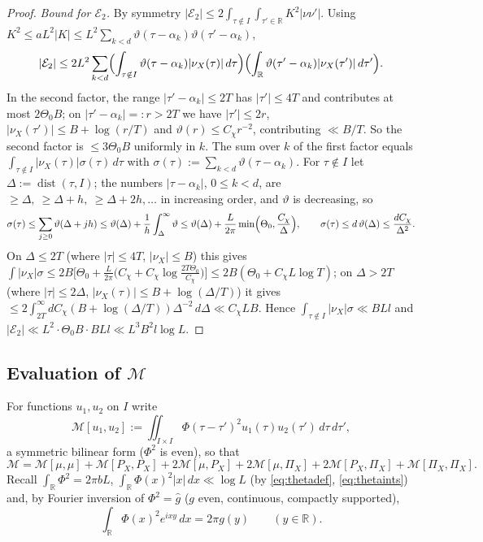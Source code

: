 \documentclass[11pt]{amsart}
\theoremstyle{definition}
\theoremstyle{remark}
\numberwithin{equation}{section}
\DeclareMathOperator{\dist}{dist}
\newcommand{\RR}{\mathbb{R}}
\newcommand{\wh}{\widehat}
\newcommand{\dd}{\,d}
\begin{document}
\begin{proof}
\emph{Bound for $\mathcal E_2$.} By symmetry $|\mathcal E_2|\le2\int_{\tau\notin I}\int_{\tau'\in\RR}K^2|\nu\nu'|$. Using $K^2\le aL^2|K|\le L^2\sum_{k<d}\vartheta(\tau-\alpha_k)\vartheta(\tau'-\alpha_k)$,
\[
|\mathcal E_2|\le2L^2\sum_{k<d}\Bigl(\int_{\tau\notin I}\vartheta(\tau-\alpha_k)|\nu_X(\tau)|\dd\tau\Bigr)\Bigl(\int_\RR\vartheta(\tau'-\alpha_k)|\nu_X(\tau')|\dd\tau'\Bigr).
\]
In the second factor, the range $|\tau'-\alpha_k|\le2T$ has $|\tau'|\le4T$ and contributes at most $2\Theta_0B$; on $|\tau'-\alpha_k|=:r>2T$ we have $|\tau'|\le2r$, $|\nu_X(\tau')|\le B+\log(r/T)$ and $\vartheta(r)\le C_\chi r^{-2}$, contributing $\ll B/T$. So the second factor is $\le3\Theta_0B$ uniformly in $k$. The sum over $k$ of the first factor equals $\int_{\tau\notin I}|\nu_X(\tau)|\sigma(\tau)\dd\tau$ with $\sigma(\tau):=\sum_{k<d}\vartheta(\tau-\alpha_k)$. For $\tau\notin I$ let $\Delta:=\dist(\tau,I)$; the numbers $|\tau-\alpha_k|$, $0\le k<d$, are $\ge\Delta,\ \ge\Delta+h,\ \ge\Delta+2h,\dots$ in increasing order, and $\vartheta$ is decreasing, so
\[
\sigma(\tau)\le\sum_{j\ge0}\vartheta(\Delta+jh)\le\vartheta(\Delta)+\frac1h\int_\Delta^\infty\vartheta\le\vartheta(\Delta)+\frac L{2\pi}\min\Bigl(\Theta_0,\frac{C_\chi}\Delta\Bigr),\qquad \sigma(\tau)\le d\,\vartheta(\Delta)\le\frac{dC_\chi}{\Delta^2}.
\]
On $\Delta\le2T$ (where $|\tau|\le4T$, $|\nu_X|\le B$) this gives $\int|\nu_X|\sigma\le2B\bigl[\Theta_0+\frac L{2\pi}\bigl(C_\chi+C_\chi\log\frac{2T\Theta_0}{C_\chi}\bigr)\bigr]\le 2B(\Theta_0+C_\chi L\log T)$; on $\Delta>2T$ (where $|\tau|\le2\Delta$, $|\nu_X(\tau)|\le B+\log(\Delta/T)$) it gives $\le2\int_{2T}^\infty dC_\chi(B+\log(\Delta/T))\Delta^{-2}\dd\Delta\ll C_\chi LB$. Hence $\int_{\tau\notin I}|\nu_X|\sigma\ll BLl$ and $|\mathcal E_2|\ll L^2\cdot\Theta_0B\cdot BLl\ll L^3B^2l\log L$.

\end{proof}

\subsection{Evaluation of $\mathcal M$}
For functions $u_1,u_2$ on $I$ write
\[
\mathcal M[u_1,u_2]:=\iint_{I\times I}\Phi(\tau-\tau')^2u_1(\tau)u_2(\tau')\dd\tau\dd\tau',
\]
a symmetric bilinear form ($\Phi^2$ is even), so that
\begin{equation}\label{eq:Msplit}
\mathcal M=\mathcal M[\mu,\mu]+\mathcal M[P_X,P_X]+2\mathcal M[\mu,P_X]+2\mathcal M[\mu,\Pi_X]+2\mathcal M[P_X,\Pi_X]+\mathcal M[\Pi_X,\Pi_X].
\end{equation}
Recall $\int_\RR\Phi^2=2\pi bL$, $\int_\RR\Phi(x)^2|x|\dd x\ll\log L$ (by \eqref{eq:thetadef}, \eqref{eq:thetaints}) and, by Fourier inversion of $\Phi^2=\wh g$ ($g$ even, continuous, compactly supported),
\begin{equation}\label{eq:Phi2FT}
\int_\RR\Phi(x)^2e^{ixy}\dd x=2\pi g(y)\qquad(y\in\RR).
\end{equation}
\end{document}
